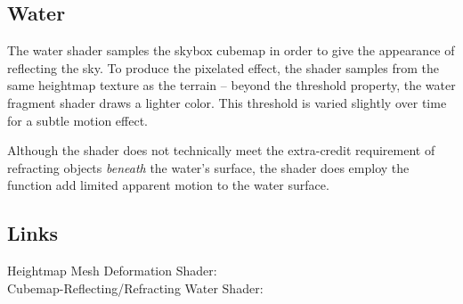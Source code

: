 \documentclass[12pt]{article}
\begin{document}
\subsection*{Water}
The water shader samples the skybox cubemap in order to give the appearance of reflecting the sky. To produce the pixelated  effect, the shader samples from the same heightmap texture as the terrain -- beyond the threshold  property, the water fragment shader draws a lighter color. This threshold is varied slightly over time for a subtle motion effect.

Although the shader does not technically meet the extra-credit requirement of refracting objects \textit{beneath} the water's surface, the shader does employ the  function add limited apparent motion to the water surface.

\subsection*{Links}
Heightmap Mesh Deformation Shader: \\
Cubemap-Reflecting/Refracting Water Shader: 
\end{document}
